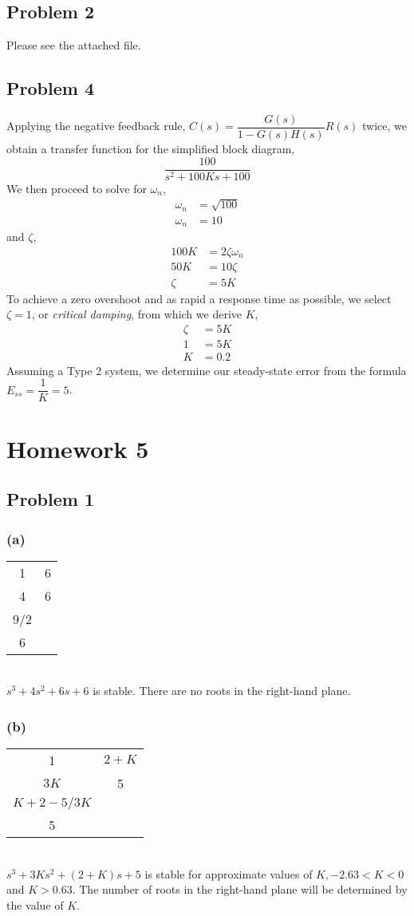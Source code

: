 \documentclass[letterpaper,10pt]{article}
\begin{document}
\subsection*{Problem 2}
Please see the attached file.

\subsection*{Problem 4}
Applying the negative feedback rule, $C(s) = \dfrac{G(s)}{1-G(s)H(s)}R(s)$ twice, we obtain a transfer function for the simplified block diagram, \[ \dfrac{100}{s^2 + 100Ks + 100}\]  We then proceed to solve for $\omega_{n}$,
\begin{align*}
	\omega_{n} &= \sqrt{100} \\
	\omega_{n} &= 10 
\end{align*}
and $\zeta$,
\begin{align*}
	100K &= 2\zeta\omega_{n} \\
	50K &= 10\zeta \\
	\zeta &= 5K
\end{align*}
To achieve a zero overshoot and as rapid a response time as possible, we select $\zeta = 1$, or \emph{critical damping}, from which we derive $K$,
\begin{align*}
	\zeta &= 5K \\
	1 &= 5K \\
	K &= 0.2 
\end{align*}
Assuming a Type 2 system, we determine our steady-state error from the formula  $E_{ss} = \dfrac{1}{K} = 5$.

\section*{Homework 5}
\subsection*{Problem 1}
\subsubsection*{(a)}
\begin{tabular}{cc}
	1&6\\
	4&6\\
	9/2&\\
	6&
\end{tabular}\\
$s^3+4s^2+6s+6$ is stable.  There are no roots in the right-hand plane.
\subsubsection*{(b)}
\begin{tabular}{cc}
	1&$2+K$\\
	$3K$&5\\
	$K+2-5/3K$&\\
	5&
\end{tabular}\\
$s^3+3Ks^2+(2+K)s+5$ is stable for approximate values of $K, -2.63 < K < 0$ and $K > 0.63$.  The number of roots in the right-hand plane will be determined by the value of $K$.
\end{document}
